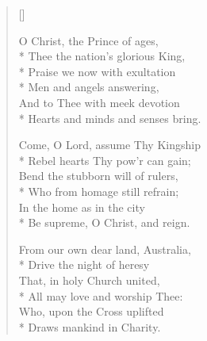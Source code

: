 \newHymn
{}

\begin{verse}[\versewidth]

 O Christ, the Prince of ages,\\*
Thee the nation's glorious King,\\*
Praise we now with exultation \\*
Men and angels answering,\\
And to Thee with meek devotion\\*
Hearts and minds and senses bring.

Come, O Lord, assume Thy Kingship\\*
Rebel hearts Thy pow'r can gain;\\
Bend the stubborn will of rulers,\\*
Who from homage still refrain;\\
In the home as in the city\\*
Be supreme, O Christ, and reign.

From our own dear land, Australia,\\*
Drive the night of heresy\\
That, in holy Church united,\\*
All may love and worship Thee: \\
Who, upon the Cross uplifted\\*
Draws mankind in Charity.

\end{verse}



